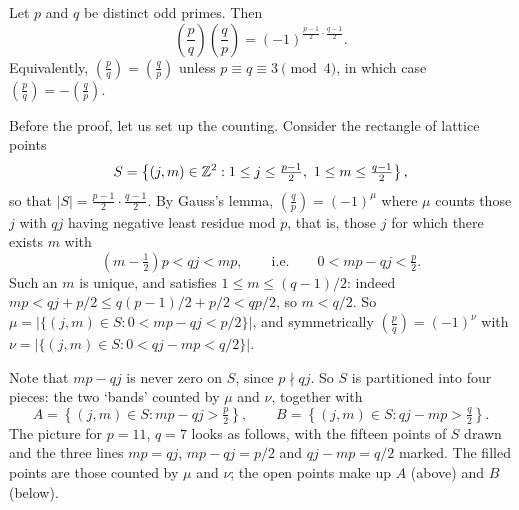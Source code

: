 \documentclass[a4paper]{scrartcl}
\newcommand{\leg}[2]{\left( \frac{#1}{#2} \right)}
\begin{document}
\begin{theorem}\label{thm:qr}
	Let $p$ and $q$ be distinct odd primes. Then
	$$
	\leg pq \leg qp = (-1)^{\frac{p-1}2 \cdot \frac{q-1}2}.
	$$
	Equivalently, $\left( \frac pq \right) = \left( \frac qp \right)$ unless $p \equiv q \equiv 3 \pmod 4$, in which case $\left( \frac pq \right) = -\left( \frac qp \right)$.
\end{theorem}

Before the proof, let us set up the counting. Consider the rectangle of lattice points
$$
S = \left\{ (j, m) \in \mathbb{Z}^2 : 1 \leq j \leq \tfrac{p-1}2, \ 1 \leq m \leq \tfrac{q-1}{2} \right\},
$$
so that $|S| = \frac{p-1}2 \cdot \frac{q-1}2$. By Gauss's lemma, $\left( \frac qp \right) = (-1)^\mu$ where $\mu$ counts those $j$ with $qj$ having negative least residue mod $p$, that is, those $j$ for which there exists $m$ with
$$
\left(m - \tfrac12\right)p < qj < mp, \qquad \text{i.e.} \qquad 0 < mp - qj < \tfrac p2.
$$
Such an $m$ is unique, and satisfies $1 \leq m \leq (q-1)/2$: indeed $mp < qj + p/2 \leq q(p-1)/2 + p/2 < qp/2$, so $m < q/2$. So $\mu = |\{(j,m) \in S : 0 < mp - qj < p/2\}|$, and symmetrically $\left( \frac pq \right) = (-1)^\nu$ with $\nu = |\{(j,m) \in S : 0 < qj - mp < q/2\}|$.

Note that $mp - qj$ is never zero on $S$, since $p \nmid qj$. So $S$ is partitioned into four pieces: the two `bands' counted by $\mu$ and $\nu$, together with
$$
A = \left\{ (j,m) \in S : mp - qj > \tfrac p2 \right\}, \qquad B = \left\{ (j,m) \in S : qj - mp > \tfrac q2 \right\}.
$$
The picture for $p = 11$, $q = 7$ looks as follows, with the fifteen points of $S$ drawn and the three lines $mp = qj$, $mp - qj = p/2$ and $qj - mp = q/2$ marked. The filled points are those counted by $\mu$ and $\nu$; the open points make up $A$ (above) and $B$ (below).

\begin{center}
\end{center}
\end{document}
